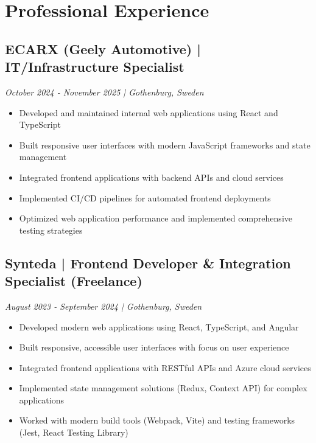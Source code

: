 \documentclass[11pt,a4paper]{article}
\begin{document}
\section*{Professional Experience}
\subsection*{ECARX (Geely Automotive) | IT/Infrastructure Specialist}
\textit{October 2024 - November 2025 | Gothenburg, Sweden}
\begin{itemize}[noitemsep]
\item Developed and maintained internal web applications using React and TypeScript
\item Built responsive user interfaces with modern JavaScript frameworks and state management
\item Integrated frontend applications with backend APIs and cloud services
\item Implemented CI/CD pipelines for automated frontend deployments
\item Optimized web application performance and implemented comprehensive testing strategies
\end{itemize}

\subsection*{Synteda | Frontend Developer \& Integration Specialist (Freelance)}
\textit{August 2023 - September 2024 | Gothenburg, Sweden}
\begin{itemize}[noitemsep]
\item Developed modern web applications using React, TypeScript, and Angular
\item Built responsive, accessible user interfaces with focus on user experience
\item Integrated frontend applications with RESTful APIs and Azure cloud services
\item Implemented state management solutions (Redux, Context API) for complex applications
\item Worked with modern build tools (Webpack, Vite) and testing frameworks (Jest, React Testing Library)
\end{itemize}
\end{document}
